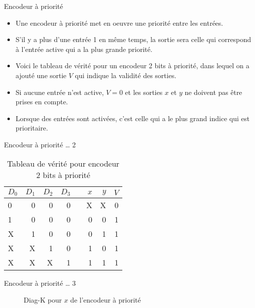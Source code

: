 \documentclass[presentation]{beamer}
\begin{document}
\begin{frame}[label={sec:org211ff5b}]{Encodeur à priorité}
\begin{itemize}
\item Une encodeur à priorité met en oeuvre une priorité entre les entrées.

\item S'il y a plus d'une entrée 1 en même temps, la sortie sera celle qui correspond à l'entrée active qui a la plus grande priorité.

\item Voici le tableau de vérité pour un encodeur 2 bits à priorité, dans lequel on a ajouté une sortie \(V\) qui indique la validité des sorties.

\item Si aucune entrée n'est active, \(V=0\) et les sorties \(x\) et \(y\) ne doivent pas être prises en compte.

\item Lorsque des entrées sont activées, c'est celle qui a le plus grand indice qui est prioritaire.
\end{itemize}
\end{frame}

\begin{frame}[label={sec:org1f3f4a6}]{Encodeur à priorité \ldots{} 2}
\begin{table}[htbp]
\caption{\label{tab:orge12cdba}Tableau de vérité pour encodeur 2 bits à priorité}
\centering
\begin{tabular}{lrrrlrrr}
\(D_0\) & \(D_1\) & \(D_2\) & \(D_3\) &  & \(x\) & \(y\) & \(V\)\\
\hline
0 & 0 & 0 & 0 &  & X & X & 0\\
1 & 0 & 0 & 0 &  & 0 & 0 & 1\\
X & 1 & 0 & 0 &  & 0 & 1 & 1\\
X & X & 1 & 0 &  & 1 & 0 & 1\\
X & X & X & 1 &  & 1 & 1 & 1\\
\end{tabular}
\end{table}
\end{frame}

\begin{frame}[label={sec:org34374a7}]{Encodeur à priorité \ldots{} 3}
\begin{figure}[htbp]
\centering

\caption{\label{fig:org76c871a}Diag-K pour \(x\) de l'encodeur à priorité}
\end{figure}
\end{frame}
\end{document}
